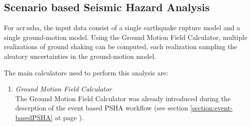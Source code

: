 \subsection{Scenario based Seismic Hazard Analysis}
\label{section:deterministicSHA}
For \gls{acr:ssha}, the input data consist of a single earthquake 
rupture model and a single ground-motion model. Using the Ground Motion Field 
Calculator, multiple realizations of ground shaking can be computed, each 
realization sampling the aleatory uncertainties in the ground-motion model.

The main calculators used to perform this analysis are:
\begin{enumerate}
\item \emph{Ground Motion Field Calculator} \hfill \\
The Ground Motion Field Calculator was already 
introduced during the descrption of the event based PSHA workflow (see section 
\ref{section:event-basedPSHA} at page \pageref{section:classicalPSHA}).
\end{enumerate}
\cleardoublepage
